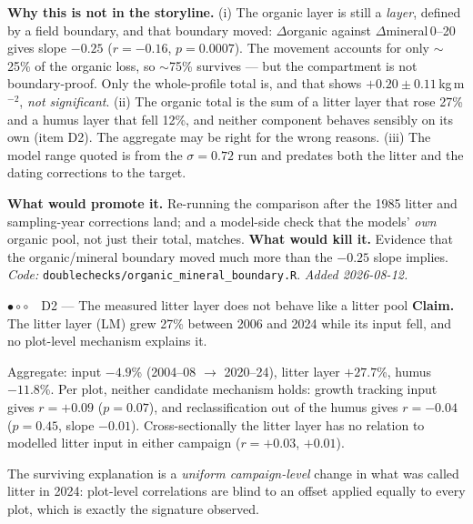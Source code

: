 \documentclass[11pt]{article}
\newcommand{\stC}{\textcolor{stweak}{$\bullet\circ\circ$}}      %
\begin{document}
\begin{caveat}
\textbf{Why this is not in the storyline.}
(i) The organic layer is still a \emph{layer}, defined by a field boundary, and that
boundary moved: $\Delta$organic against $\Delta$mineral\,0--20 gives slope $-0.25$
($r=-0.16$, $p=0.0007$). The movement accounts for only $\sim$25\% of the organic loss, so
$\sim$75\% survives --- but the compartment is not boundary-proof. Only the whole-profile
total is, and that shows $+0.20\pm0.11$\,kg\,m$^{-2}$, \emph{not significant}.
(ii) The organic total is the sum of a litter layer that rose 27\% and a humus layer that
fell 12\%, and neither component behaves sensibly on its own (item D2). The aggregate may
be right for the wrong reasons.
(iii) The model range quoted is from the $\sigma=0.72$ run and predates both the litter and
the dating corrections to the target.
\end{caveat}

\noindent\textbf{What would promote it.} Re-running the comparison after the 1985 litter and
sampling-year corrections land; and a model-side check that the models' \emph{own} organic
pool, not just their total, matches. \textbf{What would kill it.} Evidence that the
organic/mineral boundary moved much more than the $-0.25$ slope implies.
\emph{Code:} \texttt{doublechecks/organic\_mineral\_boundary.R}. \emph{Added 2026-08-12.}

\begin{finding}{\stC\ \ D2 --- The measured litter layer does not behave like a litter pool}
\textbf{Claim.} The litter layer (LM) grew 27\% between 2006 and 2024 while its input fell,
and no plot-level mechanism explains it.
\end{finding}

\noindent Aggregate: input $-4.9$\% (2004--08 $\to$ 2020--24), litter layer $+27.7$\%, humus
$-11.8$\%. Per plot, neither candidate mechanism holds: growth tracking input gives
$r=+0.09$ ($p=0.07$), and reclassification out of the humus gives $r=-0.04$ ($p=0.45$,
slope $-0.01$). Cross-sectionally the litter layer has no relation to modelled litter input
in either campaign ($r=+0.03$, $+0.01$).

\medskip
\noindent The surviving explanation is a \emph{uniform campaign-level} change in what was
called litter in 2024: plot-level correlations are blind to an offset applied equally to
every plot, which is exactly the signature observed.
\end{document}

